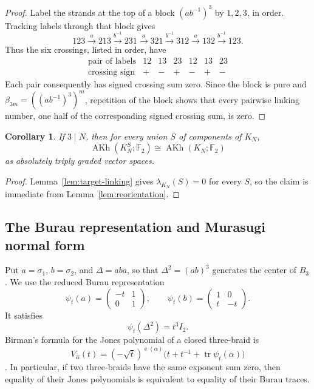 \documentclass[11pt]{amsart}
\newtheorem{corollary}[theorem]{Corollary}
\theoremstyle{remark}
\newcommand{\F}{\mathbb F_2}
\newcommand{\AKh}{\operatorname{AKh}}
\newcommand{\tr}{\operatorname{tr}}
\newcommand{\e}{\operatorname{e}}
\begin{document}
\begin{proof}
Label the strands at the top of a block \((ab^{-1})^3\) by \(1,2,3\), in order.
Tracking labels through that block gives
\[
  123\xrightarrow{a}213\xrightarrow{b^{-1}}231
  \xrightarrow{a}321\xrightarrow{b^{-1}}312
  \xrightarrow{a}132\xrightarrow{b^{-1}}123.
\]
Thus the six crossings, listed in order, have
\[
\begin{array}{c|cccccc}
\text{pair of labels}&12&13&23&12&13&23\\
\text{crossing sign}&+&-&+&-&+&-
\end{array}
\]
Each pair consequently has signed crossing sum zero.  Since the block is pure and
\(\beta_{3m}=((ab^{-1})^3)^m\), repetition of the block shows that every pairwise
linking number, one half of the corresponding signed crossing sum, is zero.
\end{proof}

\begin{corollary}\label{cor:target-reorientations}
If \(3\mid N\), then for every union \(S\) of components of \(K_N\),
\[
  \AKh(K_N^S;\F)\cong\AKh(K_N;\F)
\]
as absolutely triply graded vector spaces.
\end{corollary}

\begin{proof}
Lemma~\ref{lem:target-linking} gives \(\lambda_{K_N}(S)=0\) for every \(S\), so the
claim is immediate from Lemma~\ref{lem:reorientation}.
\end{proof}

\subsection{The Burau representation and Murasugi normal form}

Put \(a=\sigma_1\), \(b=\sigma_2\), and \(\Delta=aba\), so that
\(\Delta^2=(ab)^3\) generates the center of \(B_3\).  We use the reduced Burau
representation
\begin{equation}\label{eq:burau}
  \psi_t(a)=
  \begin{pmatrix}-t&1\\0&1\end{pmatrix},
  \qquad
  \psi_t(b)=
  \begin{pmatrix}1&0\\t&-t\end{pmatrix}.
\end{equation}
It satisfies
\begin{equation}\label{eq:center}
  \psi_t(\Delta^2)=t^3 I_2.
\end{equation}
Birman's formula for the Jones polynomial of a closed three-braid is
\begin{equation}\label{eq:birman}
  V_{\widehat\alpha}(t)
  =(-\sqrt t)^{\e(\alpha)}
    \bigl(t+t^{-1}+\tr\psi_t(\alpha)\bigr)
\end{equation}
\cite{Birman}.  In particular, if two three-braids have the same exponent sum zero,
then equality of their Jones polynomials is equivalent to equality of their Burau
traces.
\end{document}
